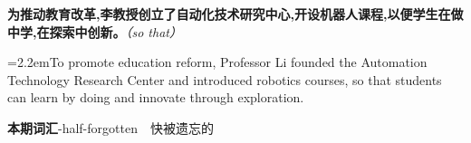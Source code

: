 \documentclass[11pt,a4paper]{article}
\newcommand{\num}[1]{\makebox[1.9em][r]{#1.}\hspace{0.3em}}
\newcommand{\prompt}[1]{\emph{\textcolor{tipblue}{\small（#1）}}}
\begin{document}
\num{4}\textbf{为推动教育改革,李教授创立了自动化技术研究中心,开设机器人课程,以便学生在做中学,在探索中创新。}\prompt{so that}

\vspace{0.15em}

\noindent\hangindent=2.2em\hspace{2.2em}To promote education reform, Professor Li founded the Automation Technology Research Center and introduced robotics courses, so that students can learn by doing and innovate through exploration.

\vspace{0.4em}\noindent{\color{rulegray}\rule{\textwidth}{0.6pt}}\vspace{0.4em}

\num{5}\textbf{本期词汇}\quad -half-forgotten　快被遗忘的
\end{document}
